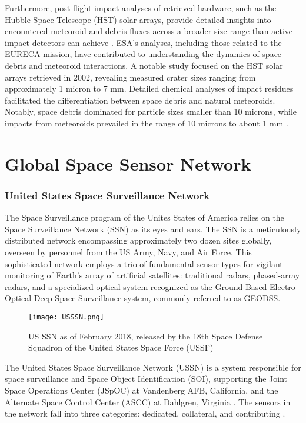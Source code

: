 Furthermore, post-flight impact analyses of retrieved hardware, such as the Hubble Space Telescope (HST) solar arrays, provide detailed insights into encountered meteoroid and debris fluxes across a broader size range than active impact detectors can achieve \cite{hst1,hst2}. ESA's analyses, including those related to the EURECA mission, have contributed to understanding the dynamics of space debris and meteoroid interactions. A notable study focused on the HST solar arrays retrieved in 2002, revealing measured crater sizes ranging from approximately 1 micron to 7 mm. Detailed chemical analyses of impact residues facilitated the differentiation between space debris and natural meteoroids. Notably, space debris dominated for particle sizes smaller than 10 microns, while impacts from meteoroids prevailed in the range of 10 microns to about 1 mm \cite{situ,hst1,hst2}.

\section{Global Space Sensor Network}


\subsubsection{United States Space Surveillance Network}
The Space Surveillance program of the Unites States of America relies on the Space Surveillance Network (SSN) as its eyes and ears. The SSN is a meticulously distributed network encompassing approximately two dozen sites globally, overseen by personnel from the US Army, Navy, and Air Force. This sophisticated network employs a trio of fundamental sensor types for vigilant monitoring of Earth's array of artificial satellites: traditional radars, phased-array radars, and a specialized optical system recognized as the Ground-Based Electro-Optical Deep Space Surveillance system, commonly referred to as GEODSS\cite{cele,GEOD}.\\

\begin{figure}[h!]
	\centering
	\texttt{[image: USSSN.png]}
	\caption{ US SSN as of February 2018, released by the 18th Space Defense Squadron of the United States Space Force (USSF) \cite{ussf}}\label{fig:USSSN}
\end{figure}

The United States Space Surveillance Network (USSN) is a system responsible for space surveillance and Space Object Identification (SOI), supporting the Joint Space Operations Center (JSpOC) at Vandenberg AFB, California, and the Alternate Space Control Center (ASCC) at Dahlgren, Virginia \cite{afspc}. The sensors in the network fall into three categories: dedicated, collateral, and contributing \cite{dia}.\\

